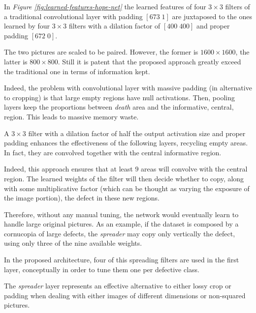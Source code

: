         \par{
            In \emph{Figure \ref{fig:learned-features-hope-net}} the learned features of four $3\times3$ filters of a traditional convolutional layer with padding $\left[673\;1\right]$ are juxtaposed to the ones learned by four $3\times 3$ filters with a dilation factor of $\left[400\;400\right]$ and proper padding $\left[672\;0\right]$. 
        }
        \par{
            The two pictures are scaled to be paired. However, the former is $1600 \times 1600$, the latter is $800\times 800$. Still it is patent that the proposed approach greatly exceed the traditional one in terms of information kept. 
        }
        \par{
            Indeed, the problem with convolutional layer with massive padding (in alternative to cropping) is that large empty regions have null activations. Then, pooling layers keep the proportions between \emph{death} area and the informative, central, region. This leads to massive memory waste.
        }
        \par{
            A $3\times 3$ filter with a dilation factor of half the output activation size and proper padding enhances the effectiveness of the following layers, recycling empty areas. In fact, they are convolved together with the central informative region.
        }
        \par{
            Indeed, this approach ensures that at least $9$ areas will convolve with the central region. The learned weights of the filter will then decide whether to copy, along with some multiplicative factor (which can be thought as varying the exposure of the image portion), the defect in these new regions.
        }
        \par{
            Therefore, without any manual tuning, the network would eventually learn to handle large original pictures. As an example, if the dataset is composed by a cornucopia of large defects, the \emph{spreader} may copy only vertically the defect, using only three of the nine available weights.
        }
        \par{
            In the proposed architecture, four of this spreading filters are used in the first layer, conceptually in order to tune them one per defective class.
        }
        \par{
            The \emph{spreader} layer represents an effective alternative to either lossy crop or padding when dealing with either images of different dimensions or non-squared pictures.
        }
